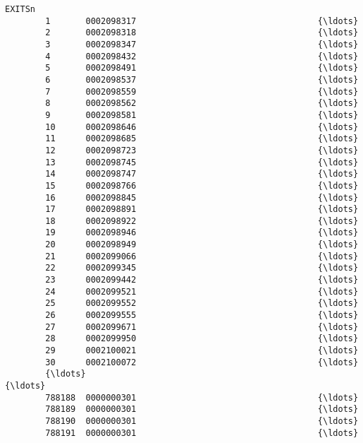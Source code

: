 \documentclass[11pt]{article}
\begin{document}
\begin{Verbatim}[commandchars=\\\{\}]
                                                           EXITSn  
        1       0002098317                                    {\ldots}  
        2       0002098318                                    {\ldots}  
        3       0002098347                                    {\ldots}  
        4       0002098432                                    {\ldots}  
        5       0002098491                                    {\ldots}  
        6       0002098537                                    {\ldots}  
        7       0002098559                                    {\ldots}  
        8       0002098562                                    {\ldots}  
        9       0002098581                                    {\ldots}  
        10      0002098646                                    {\ldots}  
        11      0002098685                                    {\ldots}  
        12      0002098723                                    {\ldots}  
        13      0002098745                                    {\ldots}  
        14      0002098747                                    {\ldots}  
        15      0002098766                                    {\ldots}  
        16      0002098845                                    {\ldots}  
        17      0002098891                                    {\ldots}  
        18      0002098922                                    {\ldots}  
        19      0002098946                                    {\ldots}  
        20      0002098949                                    {\ldots}  
        21      0002099066                                    {\ldots}  
        22      0002099345                                    {\ldots}  
        23      0002099442                                    {\ldots}  
        24      0002099521                                    {\ldots}  
        25      0002099552                                    {\ldots}  
        26      0002099555                                    {\ldots}  
        27      0002099671                                    {\ldots}  
        28      0002099950                                    {\ldots}  
        29      0002100021                                    {\ldots}  
        30      0002100072                                    {\ldots}  
        {\ldots}                                                   {\ldots}  
        788188  0000000301                                    {\ldots}  
        788189  0000000301                                    {\ldots}  
        788190  0000000301                                    {\ldots}  
        788191  0000000301                                    {\ldots}  

\end{Verbatim}
\end{document}
